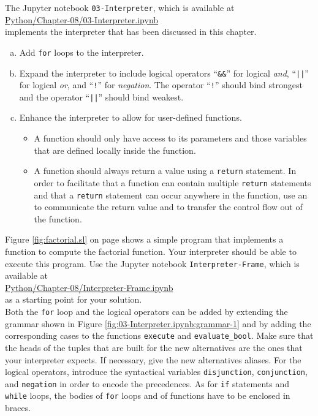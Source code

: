 \noindent
The Jupyter notebook \texttt{03-Interpreter}, which is available at
\\[0.2cm]
\hspace*{1.3cm}
\href{https://github.com/karlstroetmann/Formal-Languages/blob/master/Python/Chapter-08/03-Interpreter.ipynb}{Python/Chapter-08/03-Interpreter.ipynb}
\\[0.2cm]
implements the interpreter that has been discussed in this chapter.

\exerciseEng
\begin{enumerate}[(a)]
\item Add \texttt{for} loops to the interpreter.
\item Expand the interpreter to include logical operators
      ``\texttt{\&\&}'' for logical \emph{and}, ``\texttt{||}'' for logical \emph{or},
      and ``\texttt{!}'' for \emph{negation}.  The operator ``\texttt{!}'' should bind 
      strongest and the operator ``\texttt{||}'' should bind weakest.
\item Enhance the interpreter to allow for user-defined functions.
      \begin{itemize}
      \item A function should only have access to its parameters and those variables that
            are defined locally inside the function.  
      \item A function should always return a value using a \texttt{return} statement.
            In order to facilitate that a function can contain multiple \texttt{return}
            statements and that a \texttt{return} statement can occur
            anywhere in the function, use an  to communicate the
            return value and to transfer the control flow out of the function.
      \end{itemize}
\end{enumerate}
Figure \ref{fig:factorial.sl} on page \pageref{fig:factorial.sl} shows a simple program
that implements a function to compute the factorial function.  Your interpreter should be able to execute this
program.
Use the Jupyter notebook \texttt{Interpreter-Frame}, which is available at
\\[0.2cm]
\hspace*{1.3cm}
\href{https://github.com/karlstroetmann/Formal-Languages/blob/master/Python/Chapter-08/Interpreter-Frame.ipynb}{Python/Chapter-08/Interpreter-Frame.ipynb}
\\[0.2cm]
as a starting point for your solution.
\\[0.2cm]
\hint
Both the \texttt{for} loop and the logical operators can be added by extending the grammar shown in Figure
\ref{fig:03-Interpreter.ipynb:grammar-1} and by adding the corresponding cases to the functions
\texttt{execute} and \texttt{evaluate\_bool}.  Make sure that the heads of the tuples that are built for the
new alternatives are the ones that your interpreter expects.  If necessary, give the new alternatives
aliases.  For the logical operators, introduce the syntactical variables \texttt{disjunction},
\texttt{conjunction}, and \texttt{negation} in order to encode the precedences.  As for \texttt{if} statements and
\texttt{while} loops, the bodies of \texttt{for} loops and of functions have to be enclosed in braces.
\eox

